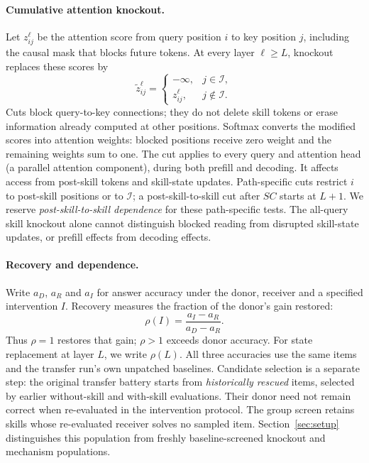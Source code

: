 \paragraph{Cumulative attention knockout.}
Let $z^\ell_{ij}$ be the attention score from query position $i$ to key
position $j$, including the causal mask that blocks future tokens.
At every layer $\ell\ge L$, knockout replaces these scores by
\begin{equation}
\widetilde z^\ell_{ij}=
\begin{cases}
-\infty,&j\in\mathcal I,\\
z^\ell_{ij},&j\notin\mathcal I.
\end{cases}
\label{eq:knockout}
\end{equation}
Cuts block query-to-key connections; they do not delete skill tokens or
erase information already computed at other positions.
Softmax converts the modified scores into attention weights: blocked
positions receive zero weight and the remaining weights sum to one.
The cut applies to every query and attention head (a parallel attention
component), during both prefill and decoding. It affects access from post-skill tokens
and skill-state updates. Path-specific cuts restrict $i$ to post-skill positions or
to $\mathcal I$; a post-skill-to-skill cut after $SC$ starts at $L+1$.
We reserve \emph{post-skill-to-skill dependence} for these path-specific
tests. The all-query skill knockout alone cannot distinguish blocked reading
from disrupted skill-state updates, or prefill effects from decoding effects.

\paragraph{Recovery and dependence.}
Write $a_D$, $a_R$ and $a_I$ for answer accuracy under the donor,
receiver and a specified intervention $I$. Recovery measures the
fraction of the donor's gain restored:
\begin{equation}
\rho(I)=\frac{a_I-a_R}{a_D-a_R}.
\label{eq:rho}
\end{equation}
Thus $\rho=1$ restores that gain; $\rho>1$ exceeds donor accuracy.
For state replacement at layer $L$, we write $\rho(L)$.
All three accuracies use the same items and the transfer run's own
unpatched baselines. Candidate selection is a separate step: the original
transfer battery starts from \emph{historically rescued} items, selected
by earlier without-skill and with-skill evaluations. Their donor need not
remain correct when re-evaluated in the intervention protocol.
The group screen retains skills whose re-evaluated receiver solves no
sampled item. Section~\ref{sec:setup} distinguishes this population from
freshly baseline-screened knockout and mechanism populations.

